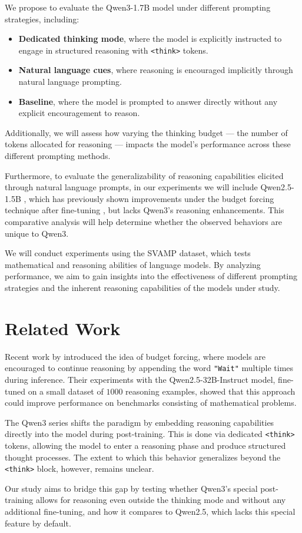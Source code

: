 \documentclass[11pt]{article}
\begin{document}
We propose to evaluate the Qwen3-1.7B model under different prompting
strategies, including:
\begin{itemize}
    \item \textbf{Dedicated thinking mode}, where the model is explicitly
    instructed to engage in structured reasoning with \texttt{<think>} tokens.
    \item \textbf{Natural language cues}, where reasoning is encouraged
    implicitly through natural language prompting.
    \item \textbf{Baseline}, where the model is prompted to answer
    directly without any explicit encouragement to reason.
\end{itemize}
Additionally, we will assess how varying the thinking budget --- the
number of tokens allocated for reasoning --- impacts the model's performance
across these different prompting methods.

Furthermore, to evaluate the generalizability of reasoning capabilities
elicited through natural language prompts, in our experiments we will
include Qwen2.5-1.5B \citep{qwen2.5}, which has previously shown improvements
under the budget forcing technique after fine-tuning \citep{s1}, but lacks
Qwen3's reasoning enhancements. This comparative analysis will help determine
whether the observed behaviors are unique to Qwen3.

We will conduct experiments using the SVAMP \citep{svamp} dataset, which tests
mathematical and reasoning abilities of language models. By analyzing
performance, we aim to gain insights into the effectiveness of different
prompting strategies and the inherent reasoning capabilities of the models
under study.

\section{Related Work}
Recent work by \citet{s1} introduced the idea of budget forcing, where models
are encouraged to continue reasoning by appending the word \texttt{"Wait"}
multiple times during inference. Their experiments with the Qwen2.5-32B-Instruct
model, fine-tuned on a small dataset of $1000$ reasoning examples, showed
that this approach could improve performance on benchmarks consisting of mathematical problems.

The Qwen3 series \citep{qwen3} shifts the paradigm by embedding reasoning
capabilities directly into the model during post-training. This is done
via dedicated \texttt{<think>} tokens, allowing the model to enter a
reasoning phase and produce structured thought processes. The extent to
which this behavior generalizes beyond the \texttt{<think>} block,
however, remains unclear.

Our study aims to bridge this gap by testing whether Qwen3's special post-training
allows for reasoning even outside the thinking mode and without any
additional fine-tuning, and how it compares to Qwen2.5, which lacks
this special feature by default.



\end{document}
